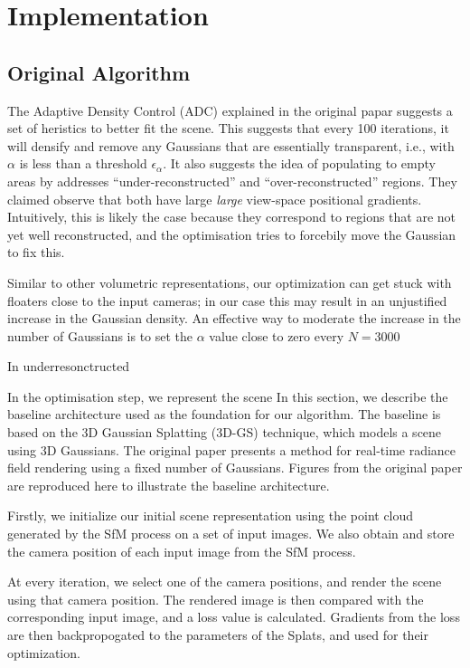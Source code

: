 \documentclass[11pt]{report}
\begin{document}
\chapter{Implementation}

\section{Original Algorithm}

The Adaptive Density Control (ADC) explained in the original papar suggests a set of heristics to better fit the scene. This suggests that every 100 iterations, it will densify and remove any Gaussians that are essentially transparent, i.e., with $\alpha$ is less than a threshold $\epsilon_\alpha$. It also suggests the idea of populating to empty areas by addresses “under-reconstructed” and “over-reconstructed” regions. They claimed observe that both have large \textit{large} view-space positional gradients. Intuitively, this is likely the case because they correspond to regions that are not yet well reconstructed, and the optimisation tries to forcebily move the Gaussian to fix this.

Similar to other volumetric representations, our optimization can get stuck with floaters close to the input cameras; in our case this may result in an unjustified increase in the Gaussian density. An effective way to moderate the increase in the number of Gaussians is to set the $\alpha$ value close to zero every $N = 3000$

In underresonctructed 

In the optimisation step, we represent the scene 
In this section, we describe the baseline architecture used as the foundation for our algorithm. The baseline is based on the 3D Gaussian Splatting (3D-GS) technique, which models a scene using 3D Gaussians. The original paper presents a method for real-time radiance field rendering using a fixed number of Gaussians. Figures from the original paper are reproduced here to illustrate the baseline architecture.

Firstly, we initialize our initial scene representation using the point cloud generated by the SfM process on a set of input images. We also obtain and store the camera position of each input image from the SfM process.

At every iteration, we select one of the camera positions, and render the scene using that camera position. The rendered image is then compared with the corresponding input image, and a loss value is calculated. Gradients from the loss are then backpropogated to the parameters of the Splats, and used for their optimization.
\end{document}
